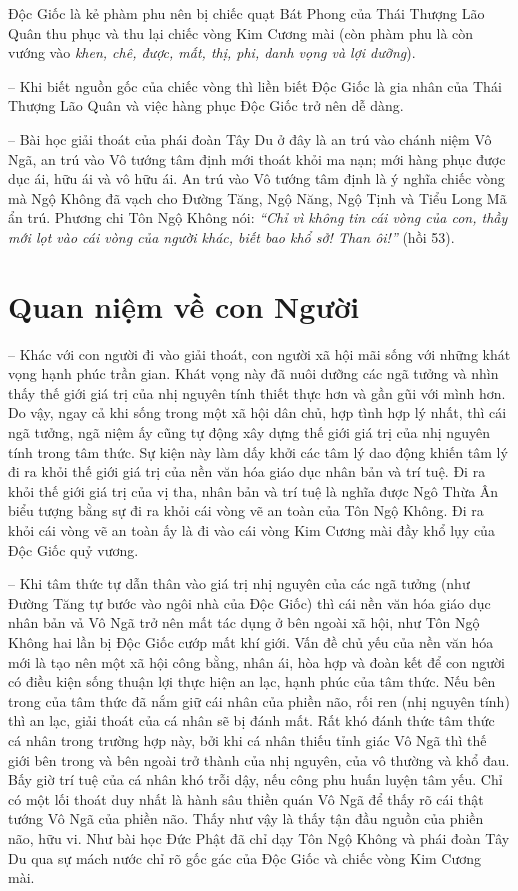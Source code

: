 Độc Giốc là kẻ phàm phu nên bị chiếc quạt Bát Phong của Thái Thượng Lão Quân thu phục và thu lại chiếc vòng Kim Cương mài (còn phàm phu là còn vướng vào \emph{khen, chê, được, mất, thị, phi, danh vọng và lợi dưỡng}).

-- Khi biết nguồn gốc của chiếc vòng thì liền biết Độc Giốc là gia nhân của Thái Thượng Lão Quân và việc hàng phục Độc Giốc trở nên dễ dàng.

-- Bài học giải thoát của phái đoàn Tây Du ở đây là an trú vào chánh niệm Vô Ngã, an trú vào Vô tướng tâm định mới thoát khỏi ma nạn; mới hàng phục được dục ái, hữu ái và vô hữu ái. An trú vào Vô tướng tâm định là ý nghĩa chiếc vòng mà Ngộ Không đã vạch cho Đường Tăng, Ngộ Năng, Ngộ Tịnh và Tiểu Long Mã ẩn trú. Phương chi Tôn Ngộ Không nói: \emph{``Chỉ vì không tin cái vòng của con, thầy mới lọt vào cái vòng của người khác, biết bao khổ sở! Than ôi!''} (hồi 53).

\section{Quan niệm về con Người} %
\label{sec:50_51_con_nguoi}

-- Khác với con người đi vào giải thoát, con người xã hội mãi sống với những khát vọng hạnh phúc trần gian. Khát vọng này đã nuôi dưỡng các ngã tưởng và nhìn thấy thế giới giá trị của nhị nguyên tính thiết thực hơn và gần gũi với mình hơn. Do vậy, ngay cả khi sống trong một xã hội dân chủ, hợp tình hợp lý nhất, thì cái ngã tưởng, ngã niệm ấy cũng tự động xây dựng thế giới giá trị của nhị nguyên tính trong tâm thức. Sự kiện này làm dấy khởi các tâm lý dao động khiến tâm lý đi ra khỏi thế giới giá trị của nền văn hóa giáo dục nhân bản và trí tuệ. Đi ra khỏi thế giới giá trị của vị tha, nhân bản và trí tuệ là nghĩa được Ngô Thừa Ân biểu tượng bằng sự đi ra khỏi cái vòng vẽ an toàn của Tôn Ngộ Không. Đi ra khỏi cái vòng vẽ an toàn ấy là đi vào cái vòng Kim Cương mài đầy khổ lụy của Độc Giốc quỷ vương.

-- Khi tâm thức tự dẫn thân vào giá trị nhị nguyên của các ngã tưởng (như Đường Tăng tự bước vào ngôi nhà của Độc Giốc) thì cái nền văn hóa giáo dục nhân bản vả Vô Ngã trở nên mất tác dụng ở bên ngoài xã hội, như Tôn Ngộ Không hai lần bị Độc Giốc cướp mất khí giới. Vấn đề chủ yếu của nền văn hóa mới là tạo nên một xã hội công bằng, nhân ái, hòa hợp và đoàn kết để con người có điều kiện sống thuận lợi thực hiện an lạc, hạnh phúc của tâm thức. Nếu bên trong của tâm thức đã nắm giữ cái nhân của phiền não, rối ren (nhị nguyên tính) thì an lạc, giải thoát của cá nhân sẽ bị đánh mất. Rất khó đánh thức tâm thức cá nhân trong trường hợp này, bởi khi cá nhân thiếu tỉnh giác Vô Ngã thì thế giới bên trong và bên ngoài trở thành của nhị nguyên, của vô thường và khổ đau. Bấy giờ trí tuệ của cá nhân khó trỗi dậy, nếu công phu huấn luyện tâm yếu. Chỉ có một lối thoát duy nhất là hành sâu thiền quán Vô Ngã để thấy rõ cái thật tướng Vô Ngã của phiền não. Thấy như vậy là thấy tận đầu nguồn của phiền não, hữu vi. Như bài học Đức Phật đã chỉ dạy Tôn Ngộ Không và phái đoàn Tây Du qua sự mách nước chỉ rõ gốc gác của Độc Giốc và chiếc vòng Kim Cương mài.

